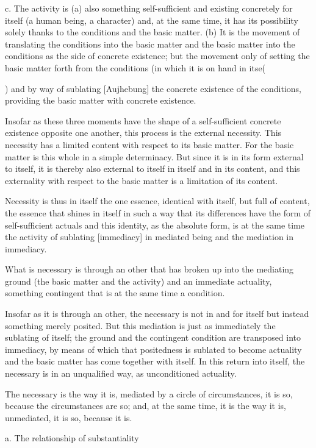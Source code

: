 c. The activity is (a) also something self-sufficient and existing concretely
for itself (a human being, a character) and, at the same time, it has its
possibility solely thanks to the conditions and the basic matter. (b) It is
the movement of translating the conditions into the basic matter and
the basic matter into the conditions as the side of concrete existence; but
the movement only of setting the basic matter forth from the conditions
(in which it is on hand in itse({) and by way of sublating [Aujhebung]
the concrete existence of the conditions, providing the basic matter with
concrete existence.

Insofar as these three moments have the shape of a self-sufficient concrete
existence opposite one another, this process is the external necessity.
This necessity has a limited content with respect to its basic matter.
For the basic matter is this whole in a simple determinacy.
But since it is in its form external to itself,
it is thereby also external to itself in itself and in its content,
and this externality with respect to the basic matter is
a limitation of its content.

Necessity is thus in itself the one essence,
identical with itself, but full of content,
the essence that shines in itself in such a way
that its differences have the form of self-sufficient actuals and
this identity, as the absolute form, is at the same time
the activity of sublating [immediacy] in mediated being and
the mediation in immediacy.

What is necessary is through an other that has broken up
into the mediating ground (the basic matter and the activity)
and an immediate actuality,
something contingent that is at the same time a condition.

Insofar as it is through an other, the necessary is
not in and for itself but instead something merely posited.
But this mediation is just as immediately the sublating of itself;
the ground and the contingent condition are transposed into immediacy,
by means of which that positedness is sublated to become actuality and
the basic matter has come together with itself.
In this return into itself, the necessary is
in an unqualified way, as unconditioned actuality.

The necessary is the way it is, mediated by a circle of circumstances,
it is so, because the circumstances are so;
and, at the same time, it is the way it is, unmediated,
it is so, because it is.

a. The relationship of substantiality

}
